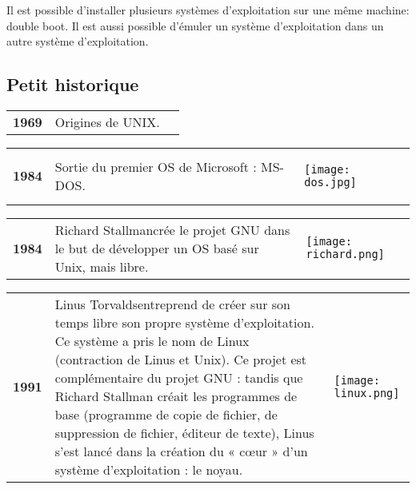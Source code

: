 Il est possible d'installer plusieurs systèmes d'exploitation sur une même machine: double boot. Il est aussi possible d'émuler un système d'exploitation dans un autre système d'exploitation.

\subsection{Petit historique}

\begin{center}
\begin{tabular}{m{1cm}m{10cm}m{6cm}}
\textbf{1969} & 
Origines de UNIX. & 
\begin{center}
\end{center}
\end{tabular}

\begin{tabular}{m{1cm}m{10cm}m{6cm}}
\textbf{1984} & 
Sortie du premier OS de Microsoft : MS-DOS. & 
\begin{center}
\texttt{[image: dos.jpg]}
\end{center}
\end{tabular}

\begin{tabular}{m{1cm}m{10cm}m{6cm}}
\textbf{1984} & 
Richard Stallman\footnotemark[1] crée le projet GNU dans le but de développer un OS basé sur Unix, mais libre. & 
\begin{center}
\texttt{[image: richard.png]}
\end{center}
\end{tabular}

\begin{tabular}{m{1cm}m{10cm}m{6cm}}
\textbf{1991} & 

Linus Torvalds\footnotemark[2] entreprend de créer sur son temps libre son propre système d'exploitation. Ce système a pris le nom de Linux (contraction de Linus et Unix). Ce projet est complémentaire du projet GNU : tandis que Richard Stallman créait les programmes de base (programme de copie de fichier, de suppression de fichier, éditeur de texte), Linus s'est lancé dans la création du « cœur » d'un système d'exploitation : le noyau.
 & 
\begin{center}
\texttt{[image: linux.png]}
\end{center}
\end{tabular}

\end{center}

